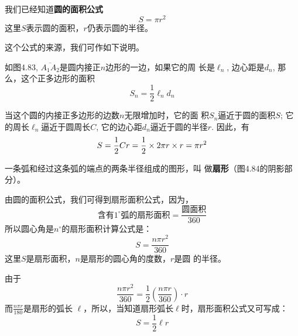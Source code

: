 我们已经知道\textbf{圆的面积公式}
\[S=\pi r^2\]
这里$S$表示圆的面积，$r$仍表示圆的半径。

这个公式的来源，我们可作如下说明。

如图4.83, $\overline{A_1A_2}$是圆内接正$n$边形的一边，如果它的周
长是$\ell_n$, 边心距是$d_n$, 
那么，这个正多边形的面积
\[S_n=\frac{1}{2}\ell_nd_n\]

当这个圆的内接正多边形的边数$n$无限增加时，它的面
积$S_n$逼近于圆的面积$S$; 它的周长$\ell_n$逼近于圆周长$C$, 
它的边心距$d_n$逼近于圆的半径$r$. 因此，有
\[S=\dfrac{1}{2}Cr=\dfrac{1}{2}\times 2\pi r\times r=\pi r^2\]

一条弧和经过这条弧的端点的两条半径组成的图形，叫
做\textbf{扇形}（图4.84的阴影部分）。

\begin{figure}[htp]\centering
  \begin{minipage}[t]{0.48\textwidth}
  \centering
{}
  \caption{}
  \end{minipage}
  \begin{minipage}[t]{0.48\textwidth}
  \centering
  \caption{}
  \end{minipage}
  \end{figure}

由圆的面积公式，我们可得到扇形面积公式，因为，
\[\text{含有$1^{\circ}$弧的扇形面积}=\frac{\text{圆面积}}{360}\]
所以圆心角是$n^{\circ}$的扇形面积计算公式是：
\[S=\frac{n\pi r^2}{360}\]
这里$S$是扇形面积，$n$是扇形的圆心角的度数，$r$是圆
的半径。

由于
\[\frac{n\pi r^2}{360}=\frac{1}{2}\left(\frac{n\pi r}{360}\right)\cdot r\]
而$\frac{n\pi r}{180}$是扇形的弧长
$\ell$，所以，当知道扇形弧长$\ell$时，扇形面积公式又可写成：
\[S=\frac{1}{2}\ell r\]


